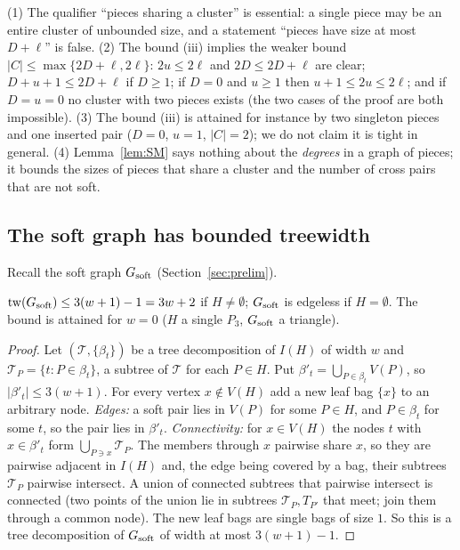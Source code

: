 \begin{remark}\label{rem:SMqual}
(1) The qualifier ``pieces sharing a cluster'' is essential: a single piece may be an entire cluster of unbounded size, and a statement ``pieces have size at most $D+\ell$'' is false. (2) The bound (iii) implies the weaker bound $|C|\le\max\{2D+\ell,2\ell\}$: $2u\le2\ell$ and $2D\le2D+\ell$ are clear; $D+u+1\le2D+\ell$ if $D\ge1$; if $D=0$ and $u\ge1$ then $u+1\le2u\le2\ell$; and if $D=u=0$ no cluster with two pieces exists (the two cases of the proof are both impossible). (3) The bound (iii) is attained for instance by two singleton pieces and one inserted pair ($D=0$, $u=1$, $|C|=2$); we do not claim it is tight in general. (4) Lemma~\ref{lem:SM} says nothing about the \emph{degrees} in a graph of pieces; it bounds the sizes of pieces that share a cluster and the number of cross pairs that are not soft.
\end{remark}


\subsection{The soft graph has bounded treewidth}
Recall the soft graph $G_{\mathrm{soft}}$ (Section~\ref{sec:prelim}).
\begin{proposition}\label{prop:soft}
$\mathrm{tw}(G_{\mathrm{soft}})\le 3(w+1)-1=3w+2$ if $H\ne\emptyset$; $G_{\mathrm{soft}}$ is edgeless if $H=\emptyset$. The bound is attained for $w=0$ ($H$ a single $P_3$, $G_{\mathrm{soft}}$ a triangle).
\end{proposition}
\begin{proof}
Let $(\mathcal T,\{\beta_t\})$ be a tree decomposition of $I(H)$ of width $w$ and $\mathcal T_P=\{t:P\in \beta_t\}$, a subtree of $\mathcal T$ for each $P\in H$. Put $\beta'_t=\bigcup_{P\in \beta_t}V(P)$, so $|\beta'_t|\le3(w+1)$. For every vertex $x\notin V(H)$ add a new leaf bag $\{x\}$ to an arbitrary node. \emph{Edges:} a soft pair lies in $V(P)$ for some $P\in H$, and $P\in \beta_t$ for some $t$, so the pair lies in $\beta'_t$. \emph{Connectivity:} for $x\in V(H)$ the nodes $t$ with $x\in \beta'_t$ form $\bigcup_{P\ni x}\mathcal T_P$. The members through $x$ pairwise share $x$, so they are pairwise adjacent in $I(H)$ and, the edge being covered by a bag, their subtrees $\mathcal T_P$ pairwise intersect. A union of connected subtrees that pairwise intersect is connected (two points of the union lie in subtrees $\mathcal T_P,T_{P'}$ that meet; join them through a common node). The new leaf bags are single bags of size $1$. So this is a tree decomposition of $G_{\mathrm{soft}}$ of width at most $3(w+1)-1$.
\end{proof}


